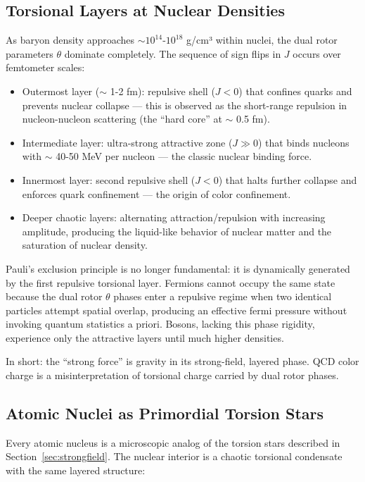 \documentclass[dvipdfmx,a4paper]{article}
\begin{document}
\subsection{Torsional Layers at Nuclear Densities}

As baryon density approaches $\sim 10^{14}$-$10^{18}$ g/cm³ within nuclei, the dual rotor parameters $\theta$ dominate completely. The sequence of sign flips in $J$ occurs over femtometer scales:

\begin{itemize}
\item Outermost layer ($\sim$ 1-2 fm): repulsive shell ($J < 0$) that confines quarks and prevents nuclear collapse — this is observed as the short-range repulsion in nucleon-nucleon scattering (the ``hard core'' at $\sim$ 0.5 fm).
\item Intermediate layer: ultra-strong attractive zone ($J \gg 0$) that binds nucleons with $\sim$ 40-50 MeV per nucleon — the classic nuclear binding force.
\item Innermost layer: second repulsive shell ($J < 0$) that halts further collapse and enforces quark confinement — the origin of color confinement.
\item Deeper chaotic layers: alternating attraction/repulsion with increasing amplitude, producing the liquid-like behavior of nuclear matter and the saturation of nuclear density.
\end{itemize}

Pauli's exclusion principle is no longer fundamental: it is dynamically generated by the first repulsive torsional layer. Fermions cannot occupy the same state because the dual rotor $\theta$ phases enter a repulsive regime when two identical particles attempt spatial overlap, producing an effective fermi pressure without invoking quantum statistics a priori. Bosons, lacking this phase rigidity, experience only the attractive layers until much higher densities.

In short: the ``strong force'' is gravity in its strong-field, layered phase. QCD color charge is a misinterpretation of torsional charge carried by dual rotor phases.

\subsection{Atomic Nuclei as Primordial Torsion Stars}

Every atomic nucleus is a microscopic analog of the torsion stars described in Section~\ref{sec:strongfield}. The nuclear interior is a chaotic torsional condensate with the same layered structure:
\end{document}
